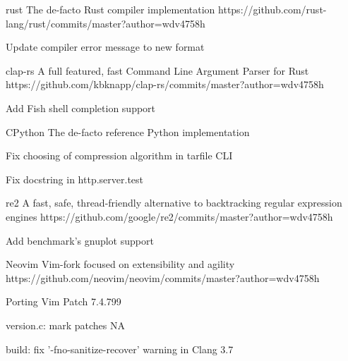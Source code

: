 \begin{cvopensources}
  \cvopensource
    {rust}   %
    {The de-facto Rust compiler implementation}  %
    {https://github.com/rust-lang/rust/commits/master?author=wdv4758h}
    {
      \begin{cvitems}   %
        \item {Update compiler error message to new format}
      \end{cvitems}
    }

  \cvopensource
    {clap-rs}   %
    {A full featured, fast Command Line Argument Parser for Rust}  %
    {https://github.com/kbknapp/clap-rs/commits/master?author=wdv4758h}
    {
      \begin{cvitems}   %
        \item {Add Fish shell completion support}
      \end{cvitems}
    }

  \cvopensource
    {CPython}   %
    {The de-facto reference Python implementation}  %
    {}
    {
      \begin{cvitems}   %
        \item {Fix choosing of compression algorithm in tarfile CLI}
        \item {Fix docstring in http.server.test}
      \end{cvitems}
    }

  \cvopensource
    {re2}   %
    {A fast, safe, thread-friendly alternative to backtracking regular expression engines}  %
    {https://github.com/google/re2/commits/master?author=wdv4758h}
    {
      \begin{cvitems}   %
        \item {Add benchmark's gnuplot support}
      \end{cvitems}
    }

  \cvopensource
    {Neovim}   %
    {Vim-fork focused on extensibility and agility}  %
    {https://github.com/neovim/neovim/commits/master?author=wdv4758h}
    {
      \begin{cvitems}   %
        \item {Porting Vim Patch 7.4.799}
        \item {version.c: mark patches NA}
        \item {build: fix '-fno-sanitize-recover' warning in Clang 3.7 }
      \end{cvitems}
    }

\end{cvopensources}
